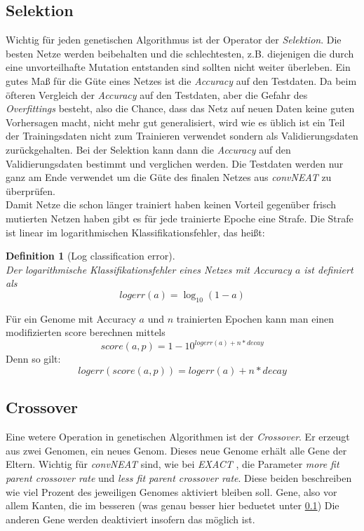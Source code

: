 \documentclass[]{scrartcl}
\newtheorem{defi}[satz]{Definition}
\begin{document}
		\subsection{Selektion}\label{select}
			
			Wichtig für jeden genetischen Algorithmus ist der Operator der \textit{Selektion}. Die besten Netze werden beibehalten und die schlechtesten,
			z.B. diejenigen die durch eine unvorteilhafte Mutation entstanden sind sollten nicht weiter überleben.
			Ein gutes Maß für die Güte eines Netzes ist die \textit{Accuracy} auf den Testdaten. Da beim öfteren Vergleich der \textit{Accuracy} auf den Testdaten,
			aber die Gefahr des \textit{Overfittings} besteht, also die Chance, dass das Netz auf neuen Daten keine guten Vorhersagen macht, nicht mehr gut generalisiert,
			wird wie es üblich ist ein Teil der Trainingsdaten nicht zum Trainieren verwendet sondern als Validierungsdaten zurückgehalten.
			Bei der Selektion kann dann die \textit{Accuracy} auf den Validierungsdaten bestimmt und verglichen werden.
			Die Testdaten werden nur ganz am Ende verwendet um die Güte des finalen Netzes aus \textit{convNEAT} zu überprüfen.\\

			Damit Netze die schon länger trainiert haben keinen Vorteil gegenüber frisch mutierten Netzen haben gibt es für jede trainierte Epoche eine Strafe.
			Die Strafe ist linear im logarithmischen Klassifikationsfehler, das heißt:

			\begin{defi}[Log classification error] ~ \\
				Der logarithmische Klassifikationsfehler eines Netzes mit Accuracy $a$ ist definiert als \\
				$$ logerr(a) = \log_{10}(1 - a)$$
			\end{defi}
		
			Für ein Genome mit Accuracy $a$ und $n$ trainierten Epochen kann man einen modifizierten score berechnen mittels\\
			$$score(a, p) =  1 - 10^{logerr(a) + n * decay}$$
			Denn so gilt:
			$$ logerr(score(a, p)) = logerr(a) + n * decay$$

		
		\subsection{Crossover}

			Eine wetere Operation in genetischen Algorithmen ist der \textit{Crossover}. Er erzeugt aus zwei Genomen, ein neues Genom.
			Dieses neue Genome erhält alle Gene der Eltern. Wichtig für \textit{convNEAT} sind, wie bei \textit{EXACT} \cite{exact},
			die Parameter \textit{more fit parent crossover rate} und \textit{less fit parent crossover rate}.
			Diese beiden beschreiben wie viel Prozent des jeweiligen Genomes aktiviert bleiben soll.
			Gene, also vor allem Kanten, die im besseren (was genau besser hier beduetet unter \ref{select})
			Die anderen Gene werden deaktiviert insofern das möglich ist.
\end{document}
